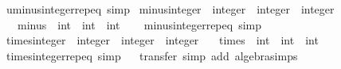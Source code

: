 \begin{isabellebody}
%
\endisatagproof
{\isafoldproof}%
%
\isadelimproof
\isanewline
%
\endisadelimproof
\isanewline
{}\isamarkupfalse%
\ uminus{\isacharunderscore}{\kern0pt}integer{\isachardot}{\kern0pt}rep{\isacharunderscore}{\kern0pt}eq\ {\isacharbrackleft}{\kern0pt}simp{\isacharbrackright}{\kern0pt}\isanewline
\isanewline
{}\isamarkupfalse%
\ minus{\isacharunderscore}{\kern0pt}integer\ {\isacharcolon}{\kern0pt}{\isacharcolon}{\kern0pt}\ {\isachardoublequoteopen}integer\ {\isasymRightarrow}\ integer\ {\isasymRightarrow}\ integer{\isachardoublequoteclose}\isanewline
\ \ \ {\isachardoublequoteopen}minus\ {\isacharcolon}{\kern0pt}{\isacharcolon}{\kern0pt}\ int\ {\isasymRightarrow}\ int\ {\isasymRightarrow}\ int{\isachardoublequoteclose}\isanewline
%
\isadelimproof
\ \ %
\endisadelimproof
%
\isatagproof
\isacommand{{\isachardot}{\kern0pt}}\isamarkupfalse%
%
\endisatagproof
{\isafoldproof}%
%
\isadelimproof
\isanewline
%
\endisadelimproof
\isanewline
{}\isamarkupfalse%
\ minus{\isacharunderscore}{\kern0pt}integer{\isachardot}{\kern0pt}rep{\isacharunderscore}{\kern0pt}eq\ {\isacharbrackleft}{\kern0pt}simp{\isacharbrackright}{\kern0pt}\isanewline
\isanewline
{}\isamarkupfalse%
\ times{\isacharunderscore}{\kern0pt}integer\ {\isacharcolon}{\kern0pt}{\isacharcolon}{\kern0pt}\ {\isachardoublequoteopen}integer\ {\isasymRightarrow}\ integer\ {\isasymRightarrow}\ integer{\isachardoublequoteclose}\isanewline
\ \ \ {\isachardoublequoteopen}times\ {\isacharcolon}{\kern0pt}{\isacharcolon}{\kern0pt}\ int\ {\isasymRightarrow}\ int\ {\isasymRightarrow}\ int{\isachardoublequoteclose}\isanewline
%
\isadelimproof
\ \ %
\endisadelimproof
%
\isatagproof
\isacommand{{\isachardot}{\kern0pt}}\isamarkupfalse%
%
\endisatagproof
{\isafoldproof}%
%
\isadelimproof
\isanewline
%
\endisadelimproof
\isanewline
{}\isamarkupfalse%
\ times{\isacharunderscore}{\kern0pt}integer{\isachardot}{\kern0pt}rep{\isacharunderscore}{\kern0pt}eq\ {\isacharbrackleft}{\kern0pt}simp{\isacharbrackright}{\kern0pt}\isanewline
\isanewline
{}\isamarkupfalse%
%
\isadelimproof
\ %
\endisadelimproof
%
\isatagproof
{}\isamarkupfalse%
\isanewline
{}\isamarkupfalse%
\ {\isacharparenleft}{\kern0pt}transfer{\isacharcomma}{\kern0pt}\ simp\ add{\isacharcolon}{\kern0pt}\ algebra{\isacharunderscore}{\kern0pt}simps{\isacharparenright}{\kern0pt}{\isacharplus}{\kern0pt}%
\endisatagproof
{\isafoldproof}%
%
\isadelimproof

\end{isabellebody}
